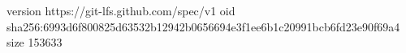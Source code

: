 version https://git-lfs.github.com/spec/v1
oid sha256:6993d6f800825d63532b12942b0656694e3f1ee6b1c20991bcb6fd23e90f69a4
size 153633
